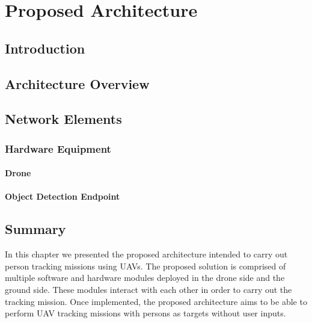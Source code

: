 \chapter{Proposed Architecture} \label{ch:BaseWork}

\section{Introduction}



\section{Architecture Overview}\label{ch:requirements}


\section{Network Elements}\label{ch:net}

\subsection{Hardware Equipment}\label{ch:hardware}



\subsubsection{Drone}






\subsubsection{Object Detection Endpoint}\label{ch:cpu}




\section{Summary}


In this chapter we presented the proposed architecture intended to carry out person tracking missions using \ac{UAV}s.  
The proposed solution is comprised of multiple software and hardware modules deployed in the drone side and the ground side. These modules interact with each other in order to carry out the tracking mission.
Once implemented, the proposed architecture aims to be able to perform \ac{UAV} tracking missions with persons as targets without user inputs. 